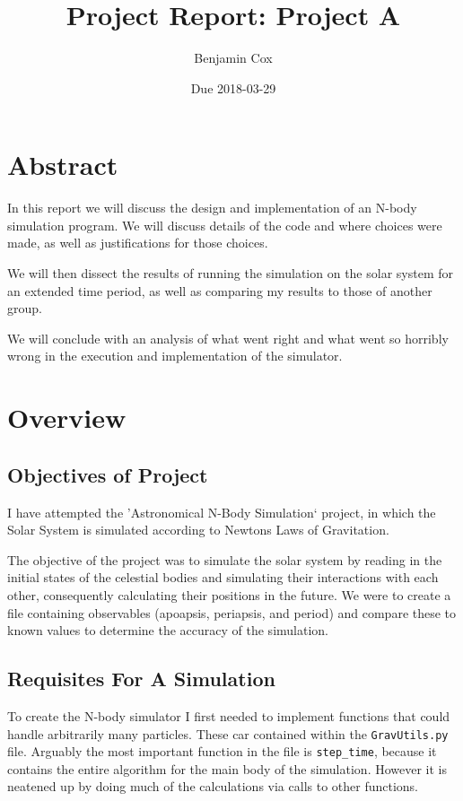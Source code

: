 \documentclass[a4paper, 11pt, british, left=1in, right=1in, top=0.3in, bottom=1in]{article}
\author{Benjamin Cox}
\title{Project Report: Project A}
\date{Due 2018-03-29}
\begin{document}
	{\maketitle}
	
	\tableofcontents
	
	\clearpage
	
	\par\vspace*{\fill}
	
	\section{Abstract}
	In this report we will discuss the design and implementation of an N-body simulation program. We will discuss details of the code and where choices were made, as well as justifications for those choices. 
	
	We will then dissect the results of running the simulation on the solar system for an extended time period, as well as comparing my results to those of another group. 
	
	We will conclude with an analysis of what went right and what went so horribly wrong in the execution and implementation of the simulator. 
	
	\pagebreak
	
	
	\section{Overview}
	\subsection{Objectives of Project}
	I have attempted the 'Astronomical N-Body Simulation` project, in which the Solar System is simulated according to Newtons Laws of Gravitation. 
	
	The objective of the project was to simulate the solar system by reading in the initial states of the celestial bodies and simulating their interactions with each other, consequently calculating their positions in the future. We were to create a file containing observables (apoapsis, periapsis, and period) and compare these to known values to determine the accuracy of the simulation. 
	
	\subsection{Requisites For A Simulation}
	To create the N-body simulator I first needed to implement functions that could handle arbitrarily many particles. These car contained within the \texttt{GravUtils.py} file. Arguably the most important function in the file is \texttt{step\_time}, because it contains the entire algorithm for the main body of the simulation. However it is neatened up by doing much of the calculations via calls to other functions. 
	
\end{document}
